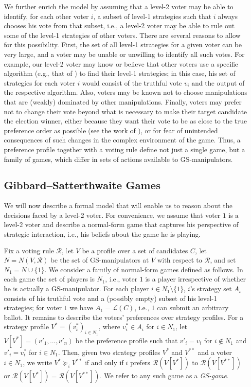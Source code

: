 \documentclass[11pt]{article}
\newcommand{\calR}{\mathcal{R}}
\newcommand{\calL}{\mathcal{L}}
\begin{document}
We further enrich the model by assuming that a level-2 voter may be able
to identify, for each other voter $i$, a subset of level-1 strategies
such that $i$ always chooses his vote from that subset, i.e., a level-2 voter
may be able to rule out some of the level-1 strategies of other voters.
There are several reasons to allow for this possibility. First, the set of all level-1 strategies
for a given voter can be very large, and a voter may be unable or unwilling to identify all 
such votes. 
For example, our level-2 voter may know or believe that other voters use a specific algorithm (e.g., that of \cite{btt89})
to find their level-1 strategies; 
in this case, his set of strategies for each voter $i$ would consist of the truthful vote $v_i$ 
and the output of the respective algorithm. Also, voters may be known not to choose 
manipulations that are (weakly) dominated by other manipulations.  
Finally, voters may prefer not to change their vote beyond what is necessary to make their target 
candidate the election winner, either because they want their vote to be as close to the true preference order as 
possible (see the work of \cite{obr-elk:c:opt}), 
or for fear of unintended consequences of such changes in the complex environment of the game.
Thus, a preference profile together with a voting rule define not just a single game, but a family
of games, which differ in sets of actions available to GS-manipulators.


\subsection{Gibbard--Satterthwaite Games}\label{sec:gs}
We will now describe a formal model that will enable us to reason about the decisions 
faced by a level-2 voter. For convenience, we assume that voter $1$ is a level-2 voter and describe
a normal-form game that captures his perspective of strategic interaction, i.e., his beliefs about the game he is playing.

Fix a voting rule $\calR$, let $V$ be a profile over a set of candidates $C$, 
let $N=N(V,\calR)$ be the set of GS-manipulators at $V$ with respect to $\calR$, and set $N_1=N\cup\{1\}$.
We consider a family of normal-form games defined as follows. 
In each game the set of players is $N_1$, i.e., voter $1$ is a player irrespective
of whether he is actually a GS-manipulator. 
For each player $i\in N_1\setminus\{1\}$, $i$'s strategy set $A_i$ consists of his truthful vote
and a (possibly empty) subset of his level-1 strategies;
for voter $1$ we have $A_1=\calL(C)$, i.e., $1$ can submit an arbitrary ballot.
It remains to describe the voters' preferences over strategy profiles.
For a strategy profile $V^* = (v^*_i)_{i\in N_1}$, where $v^*_i\in A_i$ for $i\in N_1$,
let $V[V^*]=(v'_1, \dots, v'_n)$ be the preference profile
such that $v'_i=v_i$ for $i\not \in N_1$ and $v'_i=v^*_i$ for $i\in N_1$.
Then, given two strategy profiles $V^*$ and $V^{**}$ and a voter $i\in N_1$,
we write $V^*\succeq_i V^{**}$ if and only if  $i$ prefers
$\calR(V[V^*])$ to $\calR(V[V^{**}])$ or $\calR(V[V^*])=\calR(V[V^{**}])$.
We refer to any such game as a {\em GS-game}.  
\end{document}
